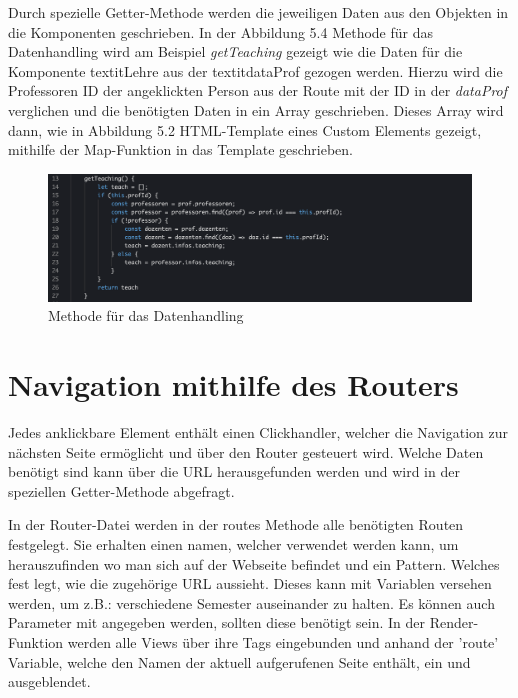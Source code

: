 \documentclass[12pt,					%
							 oneside,			%
							 a4paper,			%
							 halfparskip,		%
							 liststotoc,			%
							 bibtotoc,			%
							 fleqn,				%
							 pointlessnumbers]	%
							 {scrreprt}
\begin{document}
	Durch spezielle Getter-Methode werden die jeweiligen Daten aus den Objekten in die Komponenten geschrieben. In der Abbildung 5.4 Methode für das Datenhandling wird am Beispiel \textit{getTeaching} gezeigt wie die Daten für die Komponente textit{Lehre} aus der textit{dataProf} gezogen werden. Hierzu wird die Professoren ID der angeklickten Person aus der Route mit der ID in der \textit{dataProf} verglichen und die benötigten Daten in ein Array geschrieben. Dieses Array wird dann, wie in Abbildung 5.2 HTML-Template eines Custom Elements gezeigt, mithilfe der Map-Funktion in das Template geschrieben.
	\begin{figure}[h]
		\centering
		\includegraphics[width=1\textwidth]{pictures/getTeaching.png}
		\caption{Methode für das Datenhandling}						
		\label{getTeaching}
	\end{figure}
	
	\section{Navigation mithilfe des Routers}
	Jedes anklickbare Element enthält einen Clickhandler, welcher die Navigation zur nächsten Seite ermöglicht und über den Router gesteuert wird. Welche Daten benötigt sind kann über die URL herausgefunden werden und wird in der speziellen Getter-Methode abgefragt.	
	
	In der Router-Datei werden in der routes Methode alle benötigten Routen festgelegt.
Sie erhalten einen namen, welcher verwendet werden kann, um herauszufinden wo man sich auf der Webseite befindet und ein Pattern. Welches fest legt, wie die zugehörige URL aussieht. Dieses kann mit Variablen versehen werden, um z.B.: verschiedene Semester auseinander zu halten. Es können auch Parameter mit angegeben werden, sollten diese benötigt sein. In der Render-Funktion werden alle Views über ihre Tags eingebunden und anhand der 'route' Variable, welche den Namen der aktuell aufgerufenen Seite enthält, ein und ausgeblendet.
\end{document}
